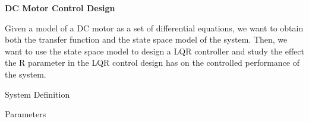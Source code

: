 \documentclass{article}
\begin{document}
\pagestyle{empty}
\begin{maplelatex}\begin{Maple Normal}{
}\end{Maple Normal}
\end{maplelatex}
\begin{maplegroup}
\begin{center}
\begin{Maple Title}{
\textbf{DC Motor Control Design}}\end{Maple Title}
\end{center}
\end{maplegroup}
\begin{maplegroup}
\begin{Maple Normal}{
Given a model of a DC motor as a set of differential equations, we want to obtain both the transfer function and the state space model of the system. Then, we want to use the state space model to design a LQR controller and study the effect the R parameter in the LQR control design has on the controlled performance of the system.}\end{Maple Normal}

\end{maplegroup}
\begin{maplelatex}\begin{Maple Heading 2}{
\textbf{}System Definition\textbf{}}\end{Maple Heading 2}
\end{maplelatex}
\begin{maplelatex}\begin{Maple Bullet Item}{
\underline{}Parameters\underline{}}\end{Maple Bullet Item}
\end{maplelatex}
\end{document}
